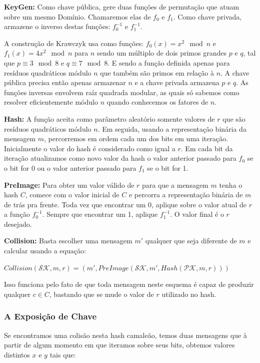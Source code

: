 \documentclass[a4paper]{article}
\begin{document}
\textbf{KeyGen: }Como chave pública, gere duas funções de permutação
que atuam sobre um mesmo Domínio. Chamaremos elas de $f_0$ e
$f_1$. Como chave privada, armazene o inverso destas funções:
$f_0^{-1}$ e $f_1^{-1}$.

A construção de Krawczyk usa como funções: $f_0(x) = x^2 \mod n$ e
$f_1(x) = 4x^2 \mod n$ para $n$ sendo um múltiplo de dois primos
grandes $p$ e $q$, tal que $p \equiv 3 \mod 8$ e $q \equiv 7 \mod
8$. E sendo a função definida apenas para resíduos quadráticos módulo
$n$ que também são primos em relação à $n$. A chave pública precisa
então apenas armazenar $n$ e a chave privada armazena $p$ e $q$. As
funções inversas envolvem raíz quadrada modular, as quais só sabemos
como resolver eficientemente módulo $n$ quando conhecemos os fatores
de $n$.

\textbf{Hash:} A função aceita como parâmetro aleatório somente
valores de $r$ que são resíduos quadráticos módulo $n$. Em seguida,
usando a representação binária da mensagem $m$, percorremos em ordem
cada um dos bits em uma iteração. Inicialmente o valor do hash é
considerado como igual a $r$. Em cada bit da iteração atualizamos como
novo valor da hash o valor anterior passado para $f_0$ se o bit for 0
ou o valor anterior passado para $f_1$ se o bit for 1.

\textbf{PreImage:} Para obter um valor válido de $r$ para que a
mensagem $m$ tenha o hash $C$, comece com o valor inicial de $C$ e
percorra a representação binária de $m$ de trás pra frente. Toda vez
que encontrar um 0, aplique sobre o valor atual de $r$ a função
$f_0^{-1}$. Sempre que encontrar um 1, aplique $f_1^{-1}$. O valor
final é o $r$ desejado.

\textbf{Collision:} Basta escolher uma mensagem $m'$ qualquer que seja
diferente de $m$ e calcular usando a equação:

$Collision(\mathcal{SK}, m, r) = (m', PreImage(\mathcal{SK}, m',
Hash(\mathcal{PK}, m, r)))$

Isso funciona pelo fato de que toda mensagem neste esquema é capaz de
produzir qualquer $c \in C$, bastando que se mude o valor de $r$
utilizado no hash.

\subsubsection{A Exposição de Chave}

Se encontramos uma colisão nesta hash camaleão, temos duas mensagens
que à partir de algum momento em que iteramos sobre seus bits, obtemos
valores distintos $x$ e $y$ tais que:
\end{document}
